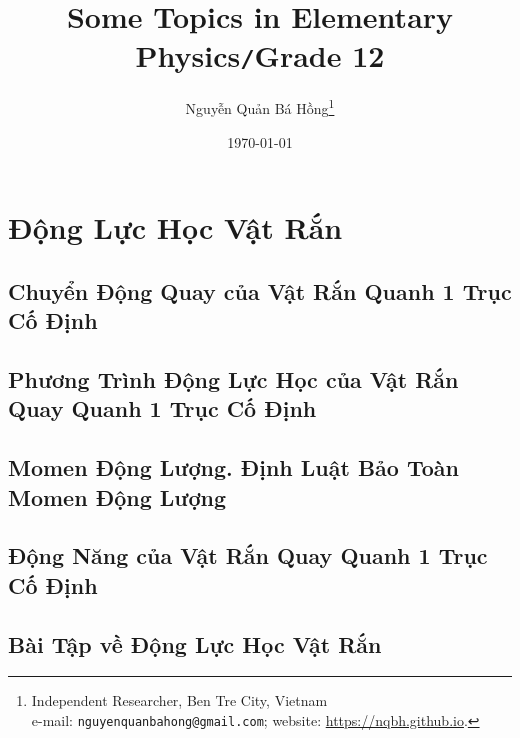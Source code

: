 \documentclass{article}
\title{Some Topics in Elementary Physics\texttt{/}Grade 12}
\author{Nguyễn Quản Bá Hồng\footnote{Independent Researcher, Ben Tre City, Vietnam\\e-mail: \texttt{nguyenquanbahong@gmail.com}; website: \url{https://nqbh.github.io}.}}
\date{\today}
\numberwithin{equation}{section}
\begin{document}
\maketitle
\begin{abstract}
	
\end{abstract}
\setcounter{secnumdepth}{4}
\setcounter{tocdepth}{3}
\tableofcontents
\newpage


\section{Động Lực Học Vật Rắn}

\subsection{Chuyển Động Quay của Vật Rắn Quanh 1 Trục Cố Định}


\subsection{Phương Trình Động Lực Học của Vật Rắn Quay Quanh 1 Trục Cố Định}


\subsection{Momen Động Lượng. Định Luật Bảo Toàn Momen Động Lượng}


\subsection{Động Năng của Vật Rắn Quay Quanh 1 Trục Cố Định}


\subsection{Bài Tập về Động Lực Học Vật Rắn}
\end{document}
